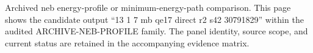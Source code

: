 Archived neb energy-profile or minimum-energy-path comparison. This page shows the candidate output ``13 1 7 mb qe17 direct r2 s42 30791829'' within the audited ARCHIVE-NEB-PROFILE family. The panel identity, source scope, and current status are retained in the accompanying evidence matrix.
